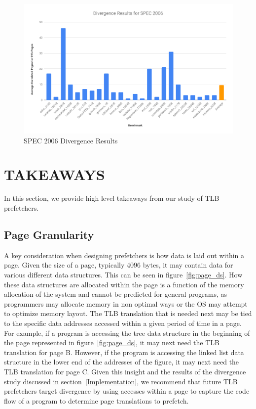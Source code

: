 \documentclass[conference]{IEEEtran}
\begin{document}
    \begin{figure}[h]
        \centering
            \includegraphics[width=.5\textwidth]{spec_divergence.pdf}
        \caption{SPEC 2006 Divergence Results}
        \label{fig:spec_divergence}
    \end{figure}

\section{TAKEAWAYS} \label{TAKEAWAYS}
    In this section, we provide high level takeaways from our study of TLB prefetchers.
    \subsection{Page Granularity}
        A key consideration when designing prefetchers is how data is laid out within a page. Given the size of a page, typically 4096 bytes, it may contain data for various different data structures. This can be seen in figure~\ref{fig:page_ds}. How these data structures are allocated within the page is a function of the memory allocation of the system and cannot be predicted for general programs, as programmers may allocate memory in non optimal ways or the OS may attempt to optimize memory layout. The TLB translation that is needed next may be tied to the specific data addresses accessed within a given period of time in a page. For example, if a program is accessing the tree data structure in the beginning of the page represented in figure~\ref{fig:page_ds}, it may next need the TLB translation for page B. However, if the program is accessing the linked list data structure in the lower end of the addresses of the figure, it may next need the TLB translation for page C. Given this insight and the results of the divergence study discussed in section~\ref{Implementation}, we recommend that future TLB prefetchers target divergence by using accesses within a page to capture the code flow of a program to determine page translations to prefetch. 
        
\end{document}
